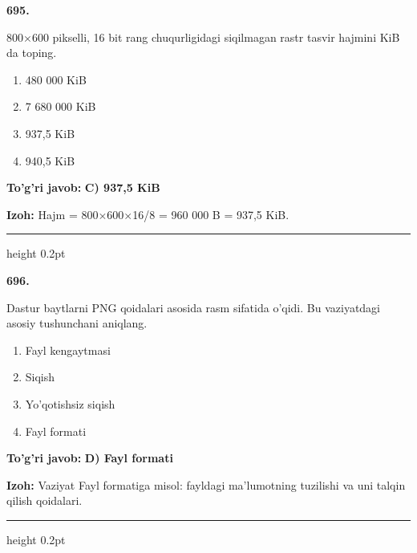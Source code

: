 \documentclass[10pt,a4paper,oneside]{article}
\begin{document}
\noindent\textbf{\color{ink}695.}
\par
800\ensuremath{\times}600 pikselli, 16 bit rang chuqurligidagi siqilmagan rastr tasvir hajmini KiB da toping.
\begin{enumerate}[label=\Alph*),leftmargin=9mm]
\item 480 000 KiB
\item 7 680 000 KiB
\item 937,5 KiB
\item 940,5 KiB
\end{enumerate}
\begin{tcolorbox}[enhanced,breakable,colback=teal!4,colframe=teal!50!black,boxrule=0.5pt,arc=1.1mm,left=3mm,right=3mm,top=1.7mm,bottom=1.7mm,before skip=2mm,after skip=2mm]
\textbf{\color{teal}To'g'ri javob:} \textbf{C) 937,5 KiB}
\par\smallskip
\textbf{Izoh:} Hajm = 800\ensuremath{\times}600\ensuremath{\times}16/8 = 960 000 B = 937,5 KiB.
\end{tcolorbox}
\vspace{2mm}\hrule height 0.2pt \vspace{3mm}

\noindent\textbf{\color{ink}696.}
\par
Dastur baytlarni PNG qoidalari asosida rasm sifatida o'qidi. Bu vaziyatdagi asosiy tushunchani aniqlang.
\begin{enumerate}[label=\Alph*),leftmargin=9mm]
\item Fayl kengaytmasi
\item Siqish
\item Yo'qotishsiz siqish
\item Fayl formati
\end{enumerate}
\begin{tcolorbox}[enhanced,breakable,colback=teal!4,colframe=teal!50!black,boxrule=0.5pt,arc=1.1mm,left=3mm,right=3mm,top=1.7mm,bottom=1.7mm,before skip=2mm,after skip=2mm]
\textbf{\color{teal}To'g'ri javob:} \textbf{D) Fayl formati}
\par\smallskip
\textbf{Izoh:} Vaziyat Fayl formatiga misol: fayldagi ma'lumotning tuzilishi va uni talqin qilish qoidalari.
\end{tcolorbox}
\vspace{2mm}\hrule height 0.2pt \vspace{3mm}
\end{document}
